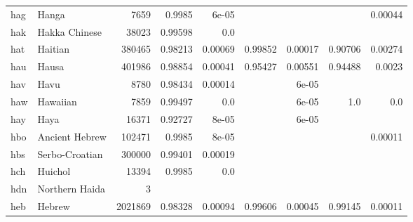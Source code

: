 \documentclass[11pt]{article}
\begin{document}
\begin{table*}[h]
{\begin{tabular}{llrrrrrrr}
hag         & Hanga         & 7659         & 0.9985         & 6e-05         &          &          &          & 0.00044         \\

hak         & Hakka Chinese         & 38023         & 0.99598         & 0.0         &          &          &          &          \\

hat         & Haitian         & 380465         & 0.98213         & 0.00069         & 0.99852         & 0.00017         & 0.90706         & 0.00274         \\

hau         & Hausa         & 401986         & 0.98854         & 0.00041         & 0.95427         & 0.00551         & 0.94488         & 0.0023         \\

hav         & Havu         & 8780         & 0.98434         & 0.00014         &          & 6e-05         &          &          \\

haw         & Hawaiian         & 7859         & 0.99497         & 0.0         &          & 6e-05         & 1.0         & 0.0         \\

hay         & Haya         & 16371         & 0.92727         & 8e-05         &          & 6e-05         &          &          \\

hbo         & Ancient Hebrew         & 102471         & 0.9985         & 8e-05         &          &          &          & 0.00011         \\

hbs         & Serbo-Croatian         & 300000         & 0.99401         & 0.00019         &          &          &          &          \\

hch         & Huichol         & 13394         & 0.9985         & 0.0         &          &          &          &          \\

hdn         & Northern Haida         & 3         &          &          &          &          &          &          \\

heb         & Hebrew         & 2021869         & 0.98328         & 0.00094         & 0.99606         & 0.00045         & 0.99145         & 0.00011         \\


\end{tabular}}
\end{table*}
\end{document}
